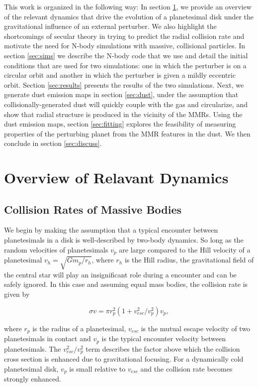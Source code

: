 \documentclass[onecolumn]{aastex63}
\begin{document}
This work is organized in the following way: In section \ref{sec:dynamics}, we provide an overview of the relevant dynamics that drive 
the evolution of a planetesimal disk under the gravitational influence of an external perturber. We also highlight the shortcomings of secular theory in trying to predict the radial collision rate and motivate the need for N-body simulations with massive, collisional particles. In section \ref{sec:sims} we describe the N-body code that we use and detail the initial conditions that are used for two simulations: one in which the perturber is on a circular orbit and another in which the perturber is given a mildly eccentric orbit. Section \ref{sec:results} presents the results of the two simulations. Next, we generate dust emission maps in section \ref{sec:dust}, under the assumption that collisionally-generated dust will quickly couple with the gas and circularize, and show that radial structure is produced in the vicinity of the MMRs. Using the dust emission maps, section \ref{sec:fitting} explores the feasibility of measuring properties of the perturbing planet from the MMR features in the dust. We then conclude in section \ref{sec:discuss}. 

\section{Overview of Relavant Dynamics} \label{sec:dynamics}

\subsection{Collision Rates of Massive Bodies}

We begin by making the assumption that a typical encounter between planetesimals in a disk is well-described by two-body 
dynamics. So long as the random velocities of planetesimals $v_{p}$ are large compared to the Hill velocity of a planetesimal $v_{h} 
= \sqrt{G m_{p} / r_{h}}$, where $r_{h}$ is the Hill radius, the gravitational field of the central star will play an insignificant role during a 
encounter and can be safely ignored. In this case and assuming equal mass bodies, the collision rate is given by 
\citep{1967SvA....10..650S}

\begin{equation}\label{eq:safronov}
	\sigma v = \pi r_{p}^2 \left( 1 + v_{esc}^2/v_{p}^2 \right) v_{p},
\end{equation}

\noindent where $r_{p}$ is the radius of a planetesimal, $v_{esc}$ is the mutual escape velocity of two planetesimals in contact and 
$v_{p}$ is the typical encounter velocity between planetesimals. The $v_{esc}^2/v_{p}^2$ term describes the factor above which the 
collision cross section is enhanced due to gravitational focusing. For a dynamically cold planetesimal disk, $v_{p}$ is small relative to 
$v_{esc}$ and the collision rate becomes strongly enhanced.
\end{document}
